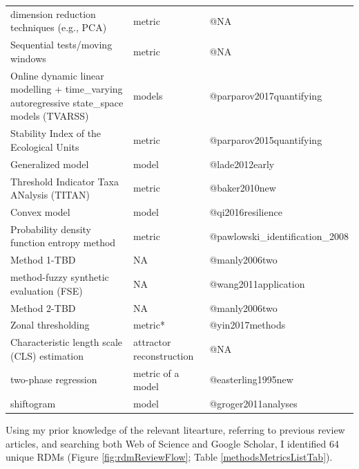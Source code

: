\documentclass[12pt,twoside,openany]{reedthesis}
\newenvironment{Shaded}{\begin{snugshade}}{\end{snugshade}}
\newcommand{\DataTypeTok}[1]{\textcolor[rgb]{0.13,0.29,0.53}{#1}}
\newcommand{\DecValTok}[1]{\textcolor[rgb]{0.00,0.00,0.81}{#1}}
\newcommand{\KeywordTok}[1]{\textcolor[rgb]{0.13,0.29,0.53}{\textbf{#1}}}
\newcommand{\NormalTok}[1]{#1}
\newcommand{\OperatorTok}[1]{\textcolor[rgb]{0.81,0.36,0.00}{\textbf{#1}}}
\newcommand{\StringTok}[1]{\textcolor[rgb]{0.31,0.60,0.02}{#1}}
\begin{document}
\begin{longtable}{lll}
dimension reduction techniques (e.g., PCA) & metric & @NA\\
\addlinespace
Sequential tests/moving windows & metric & @NA\\
Online dynamic linear modelling +  time\_varying autoregressive state\_space models (TVARSS) & models & @parparov2017quantifying\\
Stability Index of the Ecological Units & metric & @parparov2015quantifying\\
Generalized model & model & @lade2012early\\
Threshold Indicator Taxa ANalysis (TITAN) & metric & @baker2010new\\
\addlinespace
Convex model & model & @qi2016resilience\\
Probability density function entropy method & metric & @pawlowski\_identification\_2008\\
Method 1-TBD & NA & @manly2006two\\
method-fuzzy synthetic evaluation (FSE) & NA & @wang2011application\\
Method 2-TBD & NA & @manly2006two\\
\addlinespace
Zonal thresholding & metric* & @yin2017methods\\
Characteristic length scale (CLS) estimation & attractor reconstruction & @NA\\
two-phase regression & metric of a model & @easterling1995new\\
shiftogram & model & @groger2011analyses\\*
\end{longtable}
Using my prior knowledge of the relevant litearture, referring to previous review articles, and searching both Web of Science and Google Scholar, I identified 64 unique RDMs (Figure \ref{fig:rdmReviewFlow}; Table \ref{methodsMetricsListTab}).
\begin{Shaded}
\end{Shaded}
\end{document}
